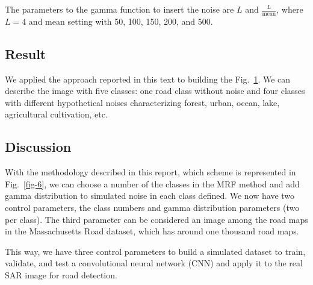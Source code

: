 \documentclass[
  journal,
]{IEEEtran}%
\begin{document}
The parameters to the gamma function to insert the noise are \(L\) and
\(\frac{L}{\text{mean}}\), where \(L=4\) and mean setting with 50, 100,
150, 200, and 500.

\subsection{Result}\label{result}

We applied the approach reported in this text to building the
Fig.~\ref{fig-5}. We can describe the image with five classes: one road
class without noise and four classes with different hypothetical noises
characterizing forest, urban, ocean, lake, agricultural cultivation,
etc.

\begin{figure}


\caption{\label{fig-5}}

\end{figure}%

\subsection{Discussion}\label{discussion}

With the methodology described in this report, which scheme is
represented in Fig.~\ref{fig-6}, we can choose a number of the classes
in the MRF method and add gamma distribution to simulated noise in each
class defined. We now have two control parameters, the class numbers and
gamma distribution parameters (two per class). The third parameter can
be considered an image among the road maps in the Massachusetts Road
dataset, which has around one thousand road maps.

This way, we have three control parameters to build a simulated dataset
to train, validate, and test a convolutional neural network (CNN) and
apply it to the real SAR image for road detection.
\end{document}
